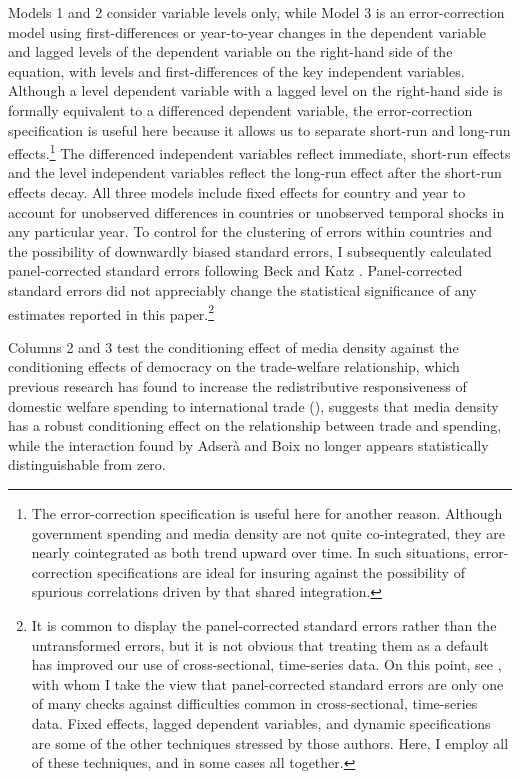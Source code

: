 \documentclass[12pt]{report}
\begin{document}
Models 1 and 2 consider variable levels only, while Model 3 is an error-correction model using
first-differences or year-to-year changes in the dependent variable and lagged levels of the
dependent variable on the right-hand side of the equation, with levels and first-differences of the
key independent variables. Although a level dependent variable with a lagged level on the right-hand
side is formally equivalent to a differenced dependent variable, the error-correction specification
is useful here because it allows us to separate short-run and long-run effects.\footnote{The
error-correction specification is useful here for another reason. Although government spending and
media density are not quite co-integrated, they are nearly cointegrated as both trend upward over
time. In such situations, error-correction specifications are ideal for insuring against the
possibility of spurious correlations driven by that shared integration.} The differenced
independent variables reflect immediate, short-run effects and the level independent variables
reflect the long-run effect after the short-run effects decay. All three models include fixed
effects for country and year to account for unobserved differences in countries or unobserved
temporal shocks in any particular year. To control for the clustering of errors within countries and
the possibility of downwardly biased standard errors, I subsequently calculated panel-corrected
standard errors following Beck and Katz \citeyearpar{Beck:1995hm}. Panel-corrected standard
errors did not appreciably change the statistical significance of any estimates reported in this
paper.\footnote{It is common to display the panel-corrected standard errors rather than the
untransformed errors, but it is not obvious that treating them as a default has improved our use of
cross-sectional, time-series data. On this point, see \citealt{Wilson:2007kz}, with whom I take the
view that panel-corrected standard errors are only one of many checks against difficulties common in
cross-sectional, time-series data. Fixed effects, lagged dependent variables, and dynamic
specifications are some of the other techniques stressed by those authors. Here, I employ all of
these techniques, and in some cases all together.}

Columns 2 and 3 test the conditioning effect of media density against the conditioning effects of
democracy on the trade-welfare relationship, which previous research has found to increase the
redistributive responsiveness of domestic welfare spending to international trade
(\citealt{Adsera:2002vt}), suggests that media density has a robust conditioning effect on the
relationship between trade and spending, while the interaction found by Adserà and Boix no longer
appears statistically distinguishable from zero.
\end{document}
